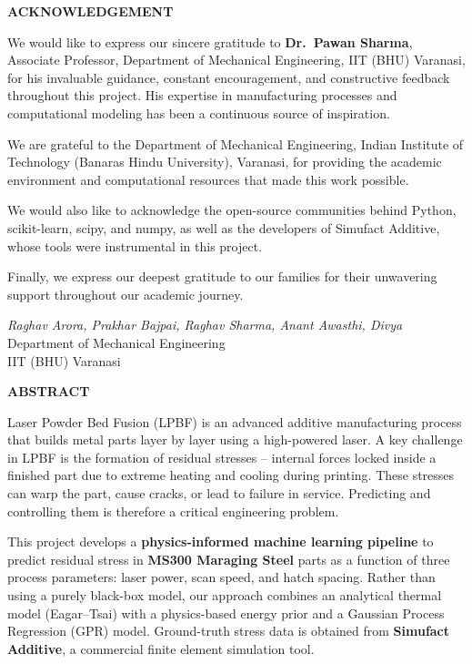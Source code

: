 \documentclass[12pt,a4paper]{report}
\begin{document}
\newpage
\thispagestyle{empty}
\begin{center}
  {\Large\bfseries ACKNOWLEDGEMENT}
\end{center}
\vspace{0.8cm}
We would like to express our sincere gratitude to \textbf{Dr.\ Pawan Sharma}, Associate Professor, Department of Mechanical Engineering, IIT (BHU) Varanasi, for his invaluable guidance, constant encouragement, and constructive feedback throughout this project. His expertise in manufacturing processes and computational modeling has been a continuous source of inspiration.

We are grateful to the Department of Mechanical Engineering, Indian Institute of Technology (Banaras Hindu University), Varanasi, for providing the academic environment and computational resources that made this work possible.

We would also like to acknowledge the open-source communities behind Python, scikit-learn, scipy, and numpy, as well as the developers of Simufact Additive, whose tools were instrumental in this project.

Finally, we express our deepest gratitude to our families for their unwavering support throughout our academic journey.

\vspace{1.5cm}
\noindent \textit{Raghav Arora, Prakhar Bajpai, Raghav Sharma, Anant Awasthi, Divya}\\
Department of Mechanical Engineering\\
IIT (BHU) Varanasi

\newpage
\thispagestyle{empty}
\begin{center}
  {\Large\bfseries ABSTRACT}
\end{center}
\vspace{0.8cm}
Laser Powder Bed Fusion (LPBF) is an advanced additive manufacturing process that builds metal parts layer by layer using a high-powered laser. A key challenge in LPBF is the formation of residual stresses -- internal forces locked inside a finished part due to extreme heating and cooling during printing. These stresses can warp the part, cause cracks, or lead to failure in service. Predicting and controlling them is therefore a critical engineering problem.

This project develops a \textbf{physics-informed machine learning pipeline} to predict residual stress in \textbf{MS300 Maraging Steel} parts as a function of three process parameters: laser power, scan speed, and hatch spacing. Rather than using a purely black-box model, our approach combines an analytical thermal model (Eagar--Tsai) with a physics-based energy prior and a Gaussian Process Regression (GPR) model. Ground-truth stress data is obtained from \textbf{Simufact Additive}, a commercial finite element simulation tool.
\end{document}
